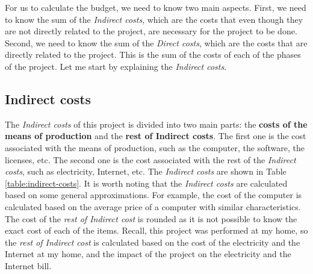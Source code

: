 For us to calculate the budget, we need to know two main aspects. First, we need to know the sum of the \textit{Indirect costs}, which are the costs that even though they are not directly related to the project, are necessary for the project to be done. Second, we need to know the sum of the \textit{Direct costs}, which are the costs that are directly related to the project. This is the sum of the costs of each of the phases of the project. Let me start by explaining the \textit{Indirect costs}.

\subsection{Indirect costs}

The \textit{Indirect costs} of this project is divided into two main parts: the \textbf{costs of the means of production} and the \textbf{rest of Indirect costs}. The first one is the cost associated with the means of production, such as the computer, the software, the licenses, etc. The second one is the cost associated with the rest of the \textit{Indirect costs}, such as electricity, Internet, etc. The \textit{Indirect costs} are shown in Table \ref{table:indirect-costs}. It is worth noting that the \textit{Indirect costs} are calculated based on some general approximations. For example, the cost of the computer is calculated based on the average price of a computer with similar characteristics. The cost of the \textit{rest of Indirect cost} is rounded as it is not possible to know the exact cost of each of the items. Recall, this project was performed at my home, so the \textit{rest of Indirect cost} is calculated based on the cost of the electricity and the Internet at my home, and the impact of the project on the electricity and the Internet bill.

